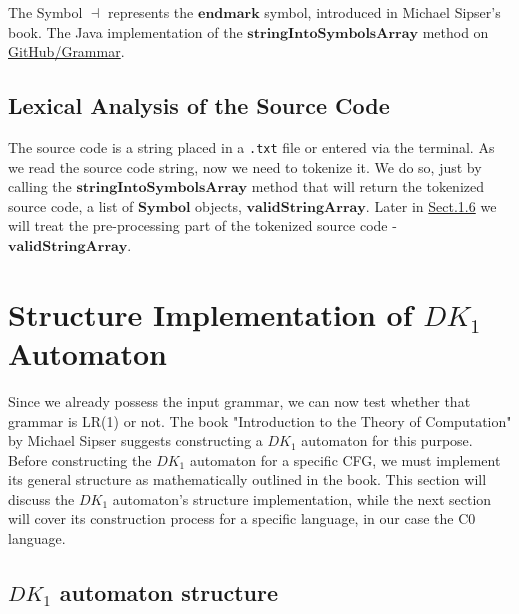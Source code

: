 The Symbol \( \dashv \) represents the \(\boldsymbol{endmark}\) symbol, introduced in Michael Sipser's book. The Java implementation of the \(\boldsymbol{stringIntoSymbolsArray}\) method on \href{https://github.com/fyfsb/dcfg/blob/main/src/main/java/grammar/Grammar.java}{GitHub/Grammar}.

\vspace{30pt}

\subsection{Lexical Analysis of the Source Code}

The source code is a string placed in a \texttt{.txt} file or entered via the terminal. As we read the source code string, now we need to tokenize it. We do so, just by calling the \(\boldsymbol{stringIntoSymbolsArray}\) method that will return the tokenized source code, a list of \(\boldsymbol{Symbol}\) objects, \(\boldsymbol{validStringArray}\). Later in \hyperref[sec:Pre-processing for C0 Source Code]{Sect.1.6} we will treat the pre-processing part of the tokenized source code - \(\boldsymbol{validStringArray}\).

\newpage


\section{Structure Implementation of \(DK_{1}\) Automaton}\label{sec:Structure Implementation of DK1 Automaton}

Since we already possess the input grammar, we can now test whether that grammar is LR(1) or not. The book "Introduction to the Theory of Computation" by Michael Sipser \cite{sipser} suggests constructing a \( DK_{1} \) automaton for this purpose. Before constructing the \( DK_{1} \) automaton for a specific CFG, we must implement its general structure as mathematically outlined in the book. This section will discuss the \( DK_{1} \) automaton’s structure implementation, while the next section will cover its construction process for a specific language, in our case the C0 language.

\vspace{15pt}

\subsection{\(DK_{1}\) automaton structure}

